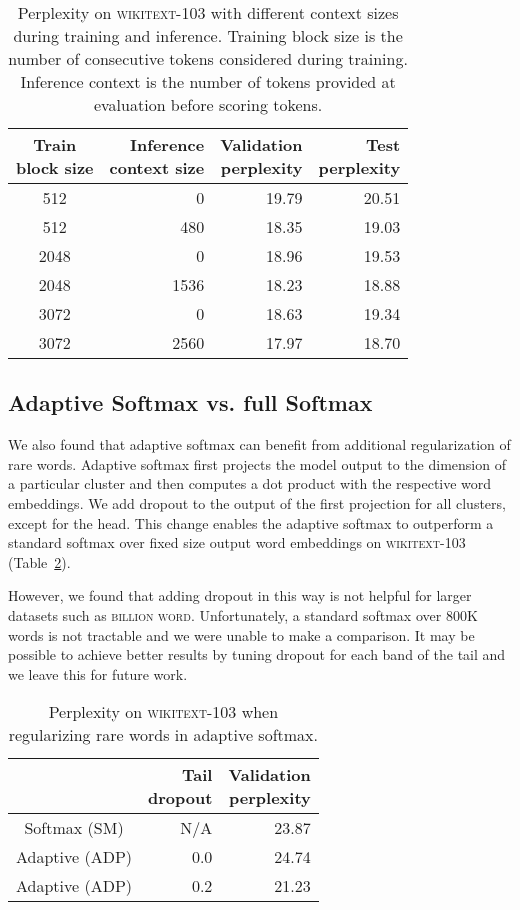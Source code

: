 \documentclass{article} \usepackage{iclr2019_conference,times}
\def\gbw{\textsc{billion word}}
\def\wiki{\textsc{wikitext-103}}
\def\sm{\textsc{SM}}
\def\adp{\textsc{ADP}}
\begin{document}
\begin{table}
\centering
\begin{tabular}{crrr}
\toprule
\thead{Train\\block size} & \thead{Inference\\context size} & \thead{Validation\\ perplexity} & \thead{Test\\ perplexity} \\ 
\midrule
512 & 0 & 19.79 & 20.51 \\
512 & 480 & 18.35 & 19.03 \\
2048 & 0 & 18.96 & 19.53 \\
2048 & 1536 & 18.23 & 18.88 \\
3072 & 0 & 18.63 & 19.34 \\
3072 & 2560 & 17.97 & 18.70 \\
\bottomrule
\end{tabular}
\caption{Perplexity on \wiki{} with different context sizes during training and inference.
Training block size is the number of consecutive tokens considered during training.
Inference context is the number of tokens provided at evaluation before scoring tokens. 
}
\label{tab:ctxt_wiki}
\end{table}




\subsection{Adaptive Softmax vs. full Softmax}

We also found that adaptive softmax can benefit from additional regularization of rare words.
Adaptive softmax first projects the model output to the dimension of a particular cluster and then computes a dot product with the respective word embeddings.
We add dropout to the output of the first projection for all clusters, except for the head.
This change enables the adaptive softmax to outperform a standard softmax over fixed size output word embeddings on \wiki{} (Table~\ref{tab:adaptive}). 

However, we found that adding dropout in this way is not helpful for larger datasets such as \gbw{}.
Unfortunately, a standard softmax over 800K words is not tractable and we were unable to make a comparison. 
It may be possible to achieve better results by tuning dropout for each band of the tail and we leave this for future work.

\begin{table}
\centering
\begin{tabular}{crr}
\toprule
 & \thead{Tail\\ dropout} & \thead{Validation\\ perplexity}
\\ 
\midrule
Softmax (\sm{}) & N/A & 23.87 \\
Adaptive (\adp{}) & 0.0 & 24.74 \\
Adaptive (\adp{}) & 0.2 & 21.23 \\
\bottomrule
\end{tabular}
\caption{Perplexity on \wiki{} when regularizing rare words in adaptive softmax.}
\label{tab:adaptive}
\end{table}
 
\end{document}
